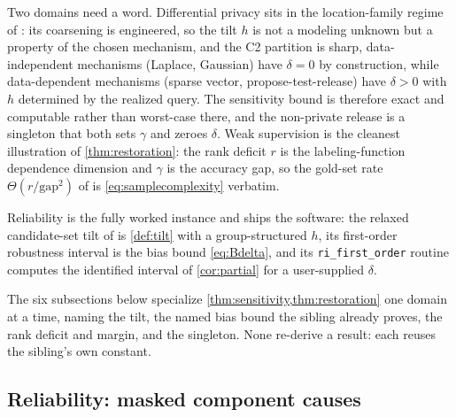 Two domains need a word. Differential privacy sits in the location-family regime of
\citet{towell2026synthesis}: its coarsening is engineered, so the tilt $h$ is not a
modeling unknown but a property of the chosen mechanism, and the C2 partition is
sharp, data-independent mechanisms (Laplace, Gaussian) have $\delta = 0$ by
construction, while data-dependent mechanisms (sparse vector, propose-test-release)
have $\delta > 0$ with $h$ determined by the realized query. The sensitivity bound
is therefore exact and computable rather than worst-case there, and the non-private
release is a singleton that both sets $\gamma$ and zeroes $\delta$. Weak supervision
is the cleanest illustration of \cref{thm:restoration}: the rank deficit $r$ is the
labeling-function dependence dimension and $\gamma$ is the accuracy gap, so the
gold-set rate $\Theta(r/\mathrm{gap}^2)$ of \citet{towell2026weaksupcoarsening} is
\eqref{eq:samplecomplexity} verbatim.

Reliability is the fully worked instance and ships the software: the relaxed
candidate-set tilt of \citet{towell2026mdrelax} is \cref{def:tilt} with a
group-structured $h$, its first-order robustness interval is the bias bound
\eqref{eq:Bdelta}, and its \texttt{ri\_first\_order} routine computes the identified
interval of \cref{cor:partial} for a user-supplied $\delta$.

The six subsections below specialize \cref{thm:sensitivity,thm:restoration} one
domain at a time, naming the tilt, the named bias bound the sibling already proves,
the rank deficit and margin, and the singleton. None re-derive a result: each reuses
the sibling's own constant.

\subsection{Reliability: masked component causes}
\label{sec:inst-reliability}


